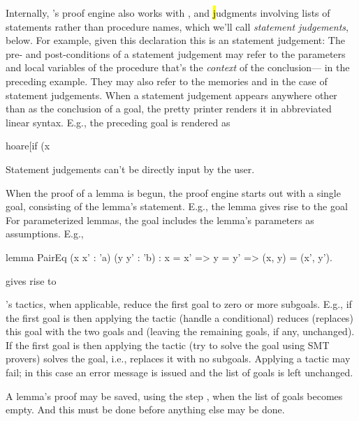 Internally, \EasyCrypt's proof engine also works with \prhl, \phl and
\hl judgments involving lists of statements rather than procedure
names, which we'll call \emph{statement judgements}, below. For
example, given this declaration
this is an \phl statement judgement:
The pre- and post-conditions of a statement judgement may refer to the
parameters and local variables of the procedure that's the
\emph{context} of the conclusion--- in the preceding
example. They may also refer to the memories  and 
in the case of \prhl statement judgements.
When a statement judgement appears anywhere other than as the conclusion of
a goal, the pretty printer renders it in abbreviated linear syntax.
E.g., the preceding goal is rendered as
\begin{easycrypt}{}{}
hoare[if (x %
\end{easycrypt}
Statement judgements can't be directly input by the user.

When the proof of a lemma is begun, the proof engine starts out with
a single goal, consisting of the lemma's statement. E.g.,
the lemma
gives rise to the goal
For parameterized lemmas, the goal includes the lemma's parameters
as assumptions. E.g.,
\begin{easycrypt}{}{}
lemma PairEq (x x' : 'a) (y y' : 'b) :
  x = x' => y = y' => (x, y) = (x', y').
\end{easycrypt}
gives rise to

\EasyCrypt's tactics, when applicable, reduce the first goal to zero
or more subgoals.  E.g., if the first goal is
then applying the  tactic (handle a conditional) reduces
(replaces) this goal with the two goals
 and
(leaving the remaining goals, if any, unchanged).
If the first goal is
then applying the  tactic (try to solve the goal using
SMT provers) solves the goal, i.e., replaces it with no subgoals.
Applying a tactic may fail; in this case an error message is issued
and the list of goals is left unchanged.

A lemma's proof may be saved, using the step , when the list
of goals becomes empty. And this must be done before anything else may
be done.




